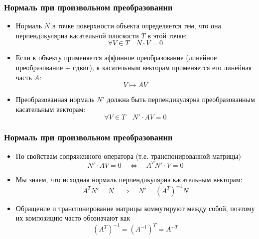 \documentclass[10pt,handout]{beamer}
\begin{document}
\begin{frame}[fragile]
\frametitle{Нормаль при произвольном преобразовании}
\begin{itemize}
\item Нормаль \begin{math}N\end{math} в точке поверхности объекта определяется тем, что она перпендикулярна касательной плоскости \begin{math}T\end{math} в этой точке:
\begin{equation*}
\forall V \in T \quad N\cdot V = 0
\end{equation*}
\pause
\item Если к объекту применяется аффинное преобразование (линейное преобразование + сдвиг), к касательным векторам применяется его линейная часть \begin{math}A\end{math}:
\begin{equation*}
V \mapsto AV
\end{equation*}
\pause
\item Преобразованная нормаль \begin{math}N'\end{math} должна быть перпендикулярна преобразованным касательным векторам:
\begin{equation*}
\forall V \in T \quad N'\cdot AV = 0
\end{equation*}
\end{itemize}
\end{frame}

\begin{frame}[fragile]
\frametitle{Нормаль при произвольном преобразовании}
\begin{itemize}
\item По свойствам сопряженного оператора (т.е. транспонированной матрицы)
\begin{equation*}
N'\cdot AV = 0 \quad \Longleftrightarrow \quad A^{T}N' \cdot V = 0
\end{equation*}
\pause
\item Мы знаем, что исходная нормаль перпендикулярна касательным векторам:
\begin{equation*}
A^{T}N' = N \quad\Longrightarrow\quad N' = (A^T)^{-1} N
\end{equation*}
\pause
\item Обращение и транспонирование матрицы коммутируют между собой, поэтому их композицию часто обозначают как
\begin{equation*}
(A^T)^{-1} = (A^{-1})^T = A^{-T}
\end{equation*}
\end{itemize}
\end{frame}
\end{document}

